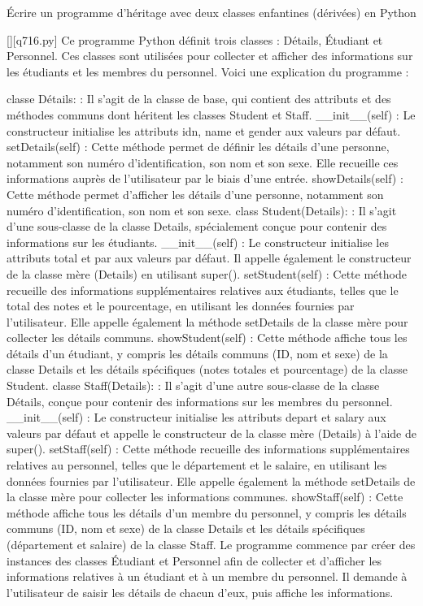         \question
        Écrire un programme d'héritage avec deux classes enfantines (dérivées) en Python
        \par
        \begin{solution}
            \renewcommand{\nomfichier}{q716.py}
            \pythonfile{\chemincode \nomfichier}[][\nomfichier]
            Ce programme Python définit trois classes : Détails, Étudiant et Personnel. Ces classes sont utilisées pour collecter et afficher des informations sur les étudiants et les membres du personnel. Voici une explication du programme :

    classe Détails: : Il s'agit de la classe de base, qui contient des attributs et des méthodes communs dont héritent les classes Student et Staff.
        __init__(self) : Le constructeur initialise les attributs idn, name et gender aux valeurs par défaut.
        setDetails(self) : Cette méthode permet de définir les détails d'une personne, notamment son numéro d'identification, son nom et son sexe. Elle recueille ces informations auprès de l'utilisateur par le biais d'une entrée.
        showDetails(self) : Cette méthode permet d'afficher les détails d'une personne, notamment son numéro d'identification, son nom et son sexe.
    class Student(Details): : Il s'agit d'une sous-classe de la classe Details, spécialement conçue pour contenir des informations sur les étudiants.
        __init__(self) : Le constructeur initialise les attributs total et par aux valeurs par défaut. Il appelle également le constructeur de la classe mère (Details) en utilisant super().
        setStudent(self) : Cette méthode recueille des informations supplémentaires relatives aux étudiants, telles que le total des notes et le pourcentage, en utilisant les données fournies par l'utilisateur. Elle appelle également la méthode setDetails de la classe mère pour collecter les détails communs.
        showStudent(self) : Cette méthode affiche tous les détails d'un étudiant, y compris les détails communs (ID, nom et sexe) de la classe Details et les détails spécifiques (notes totales et pourcentage) de la classe Student.
    classe Staff(Details): : Il s'agit d'une autre sous-classe de la classe Détails, conçue pour contenir des informations sur les membres du personnel.
        __init__(self) : Le constructeur initialise les attributs depart et salary aux valeurs par défaut et appelle le constructeur de la classe mère (Details) à l'aide de super().
        setStaff(self) : Cette méthode recueille des informations supplémentaires relatives au personnel, telles que le département et le salaire, en utilisant les données fournies par l'utilisateur. Elle appelle également la méthode setDetails de la classe mère pour collecter les informations communes.
        showStaff(self) : Cette méthode affiche tous les détails d'un membre du personnel, y compris les détails communs (ID, nom et sexe) de la classe Details et les détails spécifiques (département et salaire) de la classe Staff.
    Le programme commence par créer des instances des classes Étudiant et Personnel afin de collecter et d'afficher les informations relatives à un étudiant et à un membre du personnel. Il demande à l'utilisateur de saisir les détails de chacun d'eux, puis affiche les informations.


\end{solution}
